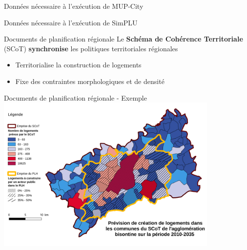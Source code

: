 \documentclass[xcolor=table]{beamer}
\begin{document}
\begin{frame}{Données nécessaire à l'exécution de MUP-City}
\end{frame}
\begin{frame}{Données nécessaire à l'exécution de SimPLU}
\end{frame}



\begin{frame}{Documents de planification régionale}
Le \textbf{Schéma de Cohérence Territoriale} (SCoT) \textbf{synchronise} les politiques territoriales régionales
\begin{itemize}
	\item Territorialise la construction de logements
	\item Fixe des contraintes morphologiques et de densité
\end{itemize}
\end{frame}

\begin{frame}{Documents de planification régionale - Exemple}
\includegraphics[width=11cm]{cartes/prevision-plh.png}
\end{frame}
\end{document}
